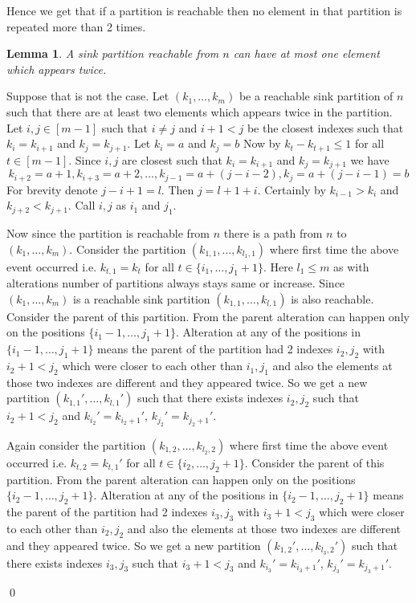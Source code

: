 \documentclass[a4paper, 11pt]{article}
\newtheorem{lemma}{Lemma}
\renewenvironment{proof}{\noindent{\it \textbf{Proof:}}\hspace*{1em}}{\hfill\qed\bigskip\\}
\begin{document}
{Hence we get that if a partition is reachable then no element in that partition is repeated more than 2 times. 
\begin{lemma}
	A sink partition reachable from $n$ can have at most one element which appears twice.
\end{lemma}
\begin{proof}
	Suppose that is not the case. Let $(k_1,\dots, k_m)$ be a reachable sink partition of $n$ such that there are at least two elements which appears twice in the partition. Let $i,j\in[m-1]$ such that $i\neq j$ and $i+1<j$ be the closest indexes such that $k_i=k_{i+1}$ and $k_j=k_{j+1}$. Let $k_i=a$ and $k_j=b$ Now by  $k_t-k_{t+1}\leq 1$ for all $t\in[m-1]$. Since $i,j$ are closest such that  $k_i=k_{i+1}$ and $k_j=k_{j+1}$ we have $$k_{i+2}=a+1,k_{i+3}=a+2,\dots,k_{j-1}=a+(j-i-2),k_j=a+(j-i-1)=b$$For brevity denote $j-i+1=l$. Then $j=l+1+i$. Certainly by  $k_{i-1}>k_i$ and $k_{j+2}<k_{j+1}$. Call $i,j$ as $i_1$ and $j_1$.
	
	Now since the partition is reachable from $n$ there is a path from $n$ to $(k_1,\dots, k_m)$. Consider the partition $(k_{1,1},\dots, k_{l_1,1})$ where first time the above event occurred i.e. $k_{t,1}=k_t$ for all $t\in\{i_1,\dots, j_1+1\}$. Here $l_1\leq m$ as with alterations number of partitions always stays same or increase. Since $(k_1,\dots, k_m)$ is a reachable sink partition $(k_{1,1},\dots, k_{l,1})$ is also reachable. Consider the parent of this partition. From the parent alteration can happen only on the positions $\{i_1-1,\dots, j_1+1\}$. Alteration at any of the positions in $\{i_1-1,\dots, j_1+1\}$ means the parent of the partition had 2 indexes $i_2,j_2$ with $i_2+1<j_2$ which were closer to each other than $i_1,j_1$ and also the elements at those two indexes are different and they appeared twice. So we get a new partition $(k_{1,1}',\dots, k_{l,1}')$ such that there exists indexes $i_2,j_2$ such that $i_2+1<j_2$ and $k_{i_2}'=k_{i_2+1}'$, $k_{j_2}'=k_{j_2+1}'$. 
	
	Again consider the partition $(k_{1,2},\dots, k_{l_2,2})$ where first time the above event occurred i.e. $k_{t,2}=k_{t,1}'$ for all $t\in\{i_2,\dots, j_2+1\}$.  Consider the parent of this partition. From the parent alteration can happen only on the positions $\{i_2-1,\dots, j_2+1\}$. Alteration at any of the positions in $\{i_2-1,\dots, j_2+1\}$ means the parent of the partition had 2 indexes $i_3,j_3$ with $i_3+1<j_3$ which were closer to each other than $i_2,j_2$ and also the elements at those two indexes are different and they appeared twice. So we get a new partition $(k_{1,2}',\dots, k_{l_3,2}')$ such that there exists indexes $i_3,j_3$ such that $i_3+1<j_3$ and $k_{i_3}'=k_{i_3+1}'$, $k_{j_3}'=k_{j_3+1}'$. 
	

\end{proof}}
\end{document}
